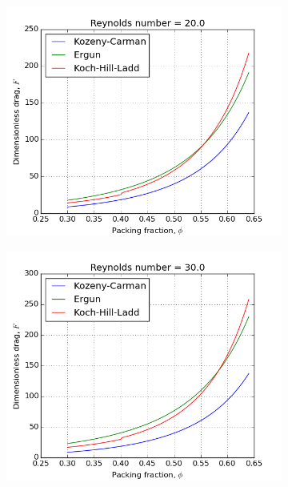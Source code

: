 \begin{figure}[!ht]
	\begin{subfigure}[b]{0.45\textwidth}
		\centering
		\includegraphics[width=\textwidth]{chapters/figures/pressure-drop-correlations/Re20.png}
	\end{subfigure}
	\begin{subfigure}[b]{0.45\textwidth}
		\centering
		\includegraphics[width=\textwidth]{chapters/figures/pressure-drop-correlations/Re30.png}
	\end{subfigure}


\end{figure}
